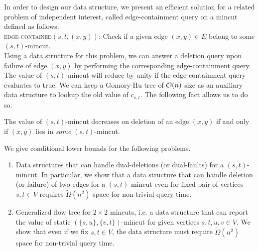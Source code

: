 In order to design our data structure, we present an efficient solution for a related problem of independent interest, called edge-containment query on a mincut defined as follows.\\

\noindent
{\textsc{edge-contained}}$(s,t,(x,y))$: Check if a given edge $(x,y)\in E$ belong to some $(s,t)$-mincut.\\

Using a data structure for this problem, we can answer a deletion query upon failure of edge $(x,y)$ by performing the corresponding edge-containment query. The value of $(s,t)$-mincut will reduce by unity if the edge-containment query evaluates to true. We can keep a Gomory-Hu tree of ${\cal O}(n)$ size as an auxiliary data structure to lookup the old value of $c_{s,t}$. The following fact allows us to do so.

\begin{fact}
\label{fact:(x,y)-lies-in-(s,t)-mincut}
The value of $(s,t)$-mincut decreases on deletion of an edge $(x,y)$ if and only if $(x,y)$ lies in \textit{some} $(s,t)$-mincut.
\end{fact}


We give conditional lower bounds for the following problems.

\begin{enumerate}
    \item Data structures that can handle dual-deletions (or dual-faults) for a $(s,t)$-mincut. In particular, we show that a data structure that can handle deletion (or failure) of two edges for a $(s,t)$-mincut even for fixed pair of vertices $s,t\in V$ requires ${\tilde \Omega}(n^2)$ space for non-trivial query time.
    \item Generalized flow tree for $2 \times 2$ mincuts, i.e. a data structure that can report the value of static $(\{s,u\},\{v,t\})$-mincut for given vertices $s,t,u,v \in V$. We show that even if we fix $s,t \in V$, the data structure must require ${\tilde \Omega}(n^2)$ space for non-trivial query time.
\end{enumerate}


